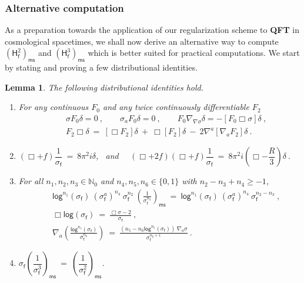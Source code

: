 \documentclass[11pt]{book}
\newcommand{\ms}{\mathsf{ms}}
\renewcommand{\log}{\mathsf{log}}
\newcommand{\Nbb}{\mathbb{N}}
\newcommand{\Hsf}{\mathsf{H}}
\newcommand{\fsf}{\mathsf{f}}
\theoremstyle{break}
\newtheorem{lemma}{Lemma}[chapter]
\begin{document}
\subsubsection{Alternative computation}


As a preparation towards the application of our regularization scheme to \textbf{QFT} in cosmological spacetimes, we shall now derive an alternative way to compute $\left(\Hsf_\fsf^2\right)_\ms$ and $\left(\Hsf_\fsf^3\right)_\ms$ which is better suited for practical computations. We start by stating and proving a few distributional identities.


\begin{lemma}\label{lem:product_identities}
The following distributional identities hold.
%
\begin{enumerate}
\item\label{item:1_product_identities} For any continuous $F_0$ and any twice continuously differentiable $F_2$
%
\begin{eqnarray*}
&& \sigma F_0 \delta = 0 \ , \qquad \sigma_a F_0 \delta = 0 \ , \qquad F_0 \nabla_{\nabla\sigma} \delta = - [F_0 \Box \sigma] \delta \ ,  \\
&& F_2 \Box \delta \ = \ [\Box F_2]\delta \ + \ \Box [F_2]\delta \ - \ 2\nabla^a[\nabla_aF_2]\delta \ . 
\end{eqnarray*}
%
%
\item\label{item:2_product_identities} $(\Box+f)\dfrac{1}{\sigma_\fsf} \ = \ 8\pi^2i\delta$, \ and \ \ $(\Box+2f)(\Box+f)\dfrac{1}{\sigma_\fsf} \ = \ 8\pi^2i \left(\Box-\dfrac{R}{3}\right)\delta \ . $
%
%
\item\label{item:3_product_identities} For all $n_1, n_2, n_3 \in \Nbb_0$ and $n_4, n_5, n_6 \in \{0,1\}$ with $n_2-n_3+n_4 \geq - 1$,
%
\begin{eqnarray*}
&& \log^{n_1}\left(\sigma_\fsf\right) \ (\sigma^a_\fsf)^{n_4} \ \sigma^{n_2}_\fsf \ \left(\frac{1}{\sigma_\fsf^{n_3}}\right)_\ms \ = \ \log^{n_1}\left(\sigma_\fsf\right) \ (\sigma^a_\fsf)^{n_4} \ \sigma^{n_2-n_3}_\fsf \ , \\
&& \Box \log(\sigma_\fsf) \ = \ \frac{\Box \sigma -2}{\sigma_\fsf} \ , \\
&& \nabla_a\left(\frac{\log^{n_5}(\sigma_\fsf)}{\sigma^{n_6}_\fsf}\right) \ = \ \frac{\left(n_5-n_6\log^{n_5}(\sigma_\fsf)\right) \ \nabla_a \sigma}{\sigma^{n_6+1}_\fsf} \ . 
\end{eqnarray*}

\item\label{item:4_product_identities} $\sigma_\fsf\left(\dfrac{1}{\sigma_\fsf^3}\right)_\ms \ = \ \left(\dfrac{1}{\sigma_\fsf^2}\right)_\ms$.
%
%
\end{enumerate}
%
\end{lemma}
\end{document}
